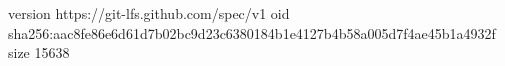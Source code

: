 version https://git-lfs.github.com/spec/v1
oid sha256:aac8fe86e6d61d7b02bc9d23c6380184b1e4127b4b58a005d7f4ae45b1a4932f
size 15638
